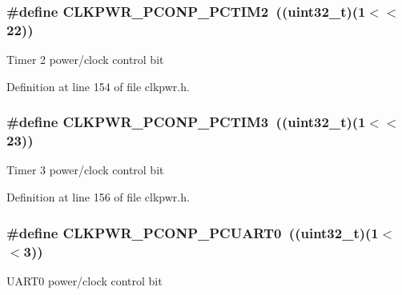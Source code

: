 \subsubsection[{\texorpdfstring{C\+L\+K\+P\+W\+R\+\_\+\+P\+C\+O\+N\+P\+\_\+\+P\+C\+T\+I\+M2}{CLKPWR_PCONP_PCTIM2}}]{\setlength{\rightskip}{0pt plus 5cm}\#define C\+L\+K\+P\+W\+R\+\_\+\+P\+C\+O\+N\+P\+\_\+\+P\+C\+T\+I\+M2~(({\bf uint32\+\_\+t})(1$<$$<$22))}\hypertarget{group___c_l_k_p_w_r___public___macros_ga5ad76b83dd27e58d257f43dc400fa4eb}{}\label{group___c_l_k_p_w_r___public___macros_ga5ad76b83dd27e58d257f43dc400fa4eb}
Timer 2 power/clock control bit 

Definition at line 154 of file clkpwr.\+h.

\subsubsection[{\texorpdfstring{C\+L\+K\+P\+W\+R\+\_\+\+P\+C\+O\+N\+P\+\_\+\+P\+C\+T\+I\+M3}{CLKPWR_PCONP_PCTIM3}}]{\setlength{\rightskip}{0pt plus 5cm}\#define C\+L\+K\+P\+W\+R\+\_\+\+P\+C\+O\+N\+P\+\_\+\+P\+C\+T\+I\+M3~(({\bf uint32\+\_\+t})(1$<$$<$23))}\hypertarget{group___c_l_k_p_w_r___public___macros_ga6d8a03a7e3535a783b132bb8755ca554}{}\label{group___c_l_k_p_w_r___public___macros_ga6d8a03a7e3535a783b132bb8755ca554}
Timer 3 power/clock control bit 

Definition at line 156 of file clkpwr.\+h.

\subsubsection[{\texorpdfstring{C\+L\+K\+P\+W\+R\+\_\+\+P\+C\+O\+N\+P\+\_\+\+P\+C\+U\+A\+R\+T0}{CLKPWR_PCONP_PCUART0}}]{\setlength{\rightskip}{0pt plus 5cm}\#define C\+L\+K\+P\+W\+R\+\_\+\+P\+C\+O\+N\+P\+\_\+\+P\+C\+U\+A\+R\+T0~(({\bf uint32\+\_\+t})(1$<$$<$3))}\hypertarget{group___c_l_k_p_w_r___public___macros_ga25e8807a1107e45cb604e0cdf82da4dd}{}\label{group___c_l_k_p_w_r___public___macros_ga25e8807a1107e45cb604e0cdf82da4dd}
U\+A\+R\+T0 power/clock control bit 

